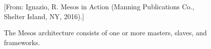 \documentclass[12pt,oneside,openright,a4paper]{cpe-english-project}
\begin{document}
\begin{figure}[!h]\centering
  \setlength{\fboxrule}{0mm} %
  \setlength{\fboxsep}{0cm}
  \caption{The Mesos architecture consists of one or more masters, slaves, and frameworks.}\label{fig:MesosArc}
  [From: Ignazio, R. Mesos in Action (Manning Publications Co., Shelter Island, NY, 2016).]
\end{figure}
\end{document}
